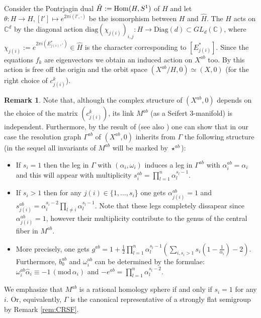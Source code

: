 \documentclass[oneside]{amsart}
\numberwithin{equation}{section}
\numberwithin{equation}{subsection}
\theoremstyle{plain}
\theoremstyle{definition}
\newtheorem{remark}[equation]{Remark}
\DeclareMathOperator{\Hom}{{\rm Hom}}
\def\C{\mathbb C}
\newcommand{\w}{\omega}
\newcommand{\al}{\alpha}
\newcommand{\z}[1]{\widehat{#1}}
\begin{document}
Consider the Pontrjagin dual $\hat{H}:=\Hom(H,S^1)$ of $H$ and let $\theta:H\to \hat{H}, [l']\mapsto e^{2\pi i (l',\cdot)}$ be the isomorphism between $H$ and $\hat{H}$. The $H$ acts on $\C^d$ by the diagonal action $\mathrm{diag}(\chi_{j(i)})_{i,j}:H\to \mathrm{Diag}(d)\subset GL_d(\C)$, where $\chi_{j(i)}:=e^{2\pi i (E^*_{j(i)},\cdot)}\in \hat{H}$ is the character corresponding to $[E^*_{j(i)}]$. Since the equations $f_k$ are eigenvectors we obtain an induced action on $X^{ab}$ too. By \cite[Theorem 2.1]{neumann.abel} this action is free off the origin and the orbit space $(X^{ab}/H,0)\simeq (X,0)$ (for the right choice of $c^k_{j(i)}$). 

\begin{remark}
Note that, although the complex structure of $(X^{ab},0)$ depends on the choice of the matrix $(c^k_{j(i)})$, its link $M^{ab}$ (as a Seifert $3$-manifold) is independent. Furthermore, by the result of \cite[Thm. 7.2]{JNSeifert} (see also \cite[5.1.17]{nembook}) one can show that  in our case the resolution graph $\Gamma^{ab}$ of $(X^{ab},0)$ inherits from $\Gamma$ the following structure (in the sequel all invariants of $M^{ab}$ will be marked by $\star^{ab}$):
\begin{itemize}
 \item If $s_i=1$ then the leg in $\Gamma$ with $(\al_i,\w_i)$ induces a leg in $\Gamma^{ab}$ with $\al^{ab}_i=\al_i$ and this will appear with multiplicity $s^{ab}_i=\prod_{l=1}^n\al_{l}^{s_l-1}$.
 \item If $s_i>1$ then for any $j(i)\in\{1,\dots,s_i$\} one gets $\al^{ab}_{j(i)}=1$ and $s^{ab}_{j(i)}=\al_i^{s_i-2}\prod_{l\neq i}\al_l^{s_l-1}$. Note that these legs completely dissapear since $\al^{ab}_{j(i)}=1$, however their multiplicity contribute to the genus of the central fiber in $M^{ab}$. 
 \item More precisely, one gets $g^{ab}=1+\frac{1}{2}\prod_{l=1}^n\al_l^{s_l-1}(\sum_{i,s_i>1}s_i(1-\frac{1}{\al_i})-2)$. Furthermore, $b_0^{ab}$ and $\w^{ab}_i$ can be determined by the formulae: $\w^{ab}_i\z{\al}_i\equiv -1 \,(\mathrm{mod }\, \al_i)$ and $-e^{ab}=\prod_{l=1}^n \al_l^{s_l-2}$. 
\end{itemize}
We emphasize that $M^{ab}$ is a rational homology sphere if and only if $s_i=1$ for any $i$. Or, equivalently, $\Gamma$ is the canonical representative of a strongly flat semigroup by Remark \ref{rem:CRSF}. 
\end{remark}
\end{document}
